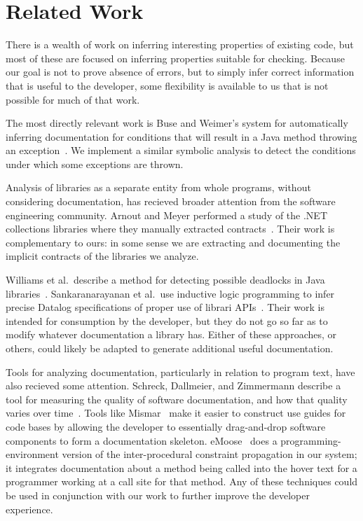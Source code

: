 \section{Related Work}
There is a wealth of work on inferring interesting properties of existing code,
but most of these are focused on inferring properties suitable for checking.
Because our goal is not to prove absence of errors, but to simply infer correct
information that is useful to the developer, some flexibility is available to us
that is not possible for much of that work.

The most directly relevant work is Buse and Weimer's system for automatically
inferring documentation for conditions that will result in a Java method
throwing an exception~\cite{autodoc}.  We implement a similar symbolic analysis
to detect the conditions under which some exceptions are thrown.

Analysis of libraries as a separate entity from whole programs, without
considering documentation, has recieved broader attention from the software
engineering community.  Arnout and Meyer performed a study of the .NET
collections libraries where they manually extracted
contracts~\cite{findingcontracts}.  Their work is complementary to ours: in some
sense we are extracting and documenting the implicit contracts of the libraries
we analyze.

Williams et al.~describe a method for
detecting possible deadlocks in Java libraries~\cite{deadlocklibs}.
Sankaranarayanan et al.~use inductive logic programming to infer precise Datalog
specifications of proper use of librari APIs~\cite{mininglibspecs}.  Their work
is intended for consumption by the developer, but they do not go so far as to
modify whatever documentation a library has.  Either of these approaches, or
others, could likely be adapted to generate additional useful documentation.

Tools for analyzing documentation, particularly in relation to program text,
have also recieved some attention.  Schreck,
Dallmeier, and Zimmermann describe a tool for measuring the quality of software
documentation, and how that quality varies over time~\cite{evolvedoc}. Tools
like Mismar~\cite{mismar} make it easier to construct use guides for code bases by allowing
the developer to essentially drag-and-drop software components to form a
documentation skeleton.  eMoose~\cite{emoose} does a programming-environment version of the
inter-procedural constraint propagation in our system; it integrates
documentation about a method being called into the hover text for a programmer
working at a call site for that method.  Any of these techniques could be used
in conjunction with our work to further improve the developer experience.


